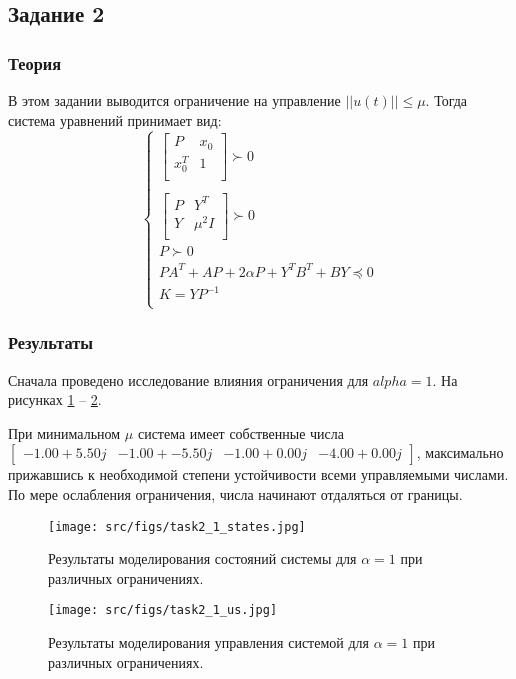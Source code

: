 \subsection{Задание 2}
\subsubsection{Теория}
В этом задании выводится ограничение на управление \(||u(t)|| \leq \mu\). Тогда система уравнений принимает вид: 
\[
        \begin{cases}
                \begin{bmatrix}
                    P &  x_0\\
                    x_0^T &  1 \\
                \end{bmatrix} \succ 0 \\
                \\
                \begin{bmatrix}
                    P &  Y^T\\
                    Y &  \mu^2I \\
                \end{bmatrix} \succ 0 \\
                P \succ 0 \\
                PA^T + AP + 2 \alpha P + Y^T B^T + BY \preccurlyeq 0  \\
                K = YP^{-1}\\
        \end{cases} 
\]




\subsubsection{Результаты}
Сначала проведено исследование влияния ограничения для \(alpha = 1\).  На рисунках \ref{fig:task2_1_states} -- \ref{fig:task2_1_us}.

При минимальном \(\mu\) система имеет собственные числа \( \begin{bmatrix}
    -1.00 + 5.50j & -1.00 + -5.50j & -1.00 + 0.00j & -4.00 + 0.00j
   \end{bmatrix} \), максимально прижавшись к необходимой степени устойчивости всеми управляемыми числами. По мере ослабления ограничения, числа начинают отдаляться от границы.
\begin{figure}[ht!]
    \centering
    \texttt{[image: src/figs/task2\_1\_states.jpg]}
    \caption{Результаты моделирования состояний системы для \(\alpha = 1\) при различных ограничениях.}
    \label{fig:task2_1_states}
\end{figure}
\begin{figure}[ht!]
    \centering
    \texttt{[image: src/figs/task2\_1\_us.jpg]}
    \caption{Результаты моделирования управления системой для \(\alpha = 1\) при различных ограничениях.}
    \label{fig:task2_1_us}
\end{figure}

